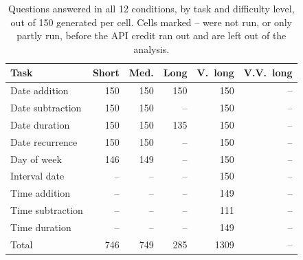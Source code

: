 \begin{table}[t]
\centering
\small
\setlength{\tabcolsep}{3.5pt}
\begin{tabular}{@{}lrrrrr@{}}
\toprule
Task & Short & Med. & Long & V.\ long & V.V.\ long \\
\midrule
Date addition & 150 & 150 & 150 & 150 & -- \\
Date subtraction & 150 & 150 & -- & 150 & -- \\
Date duration & 150 & 150 & 135 & 150 & -- \\
Date recurrence & 150 & 150 & -- & 150 & -- \\
Day of week & 146 & 149 & -- & 150 & -- \\
Interval date & -- & -- & -- & 150 & -- \\
Time addition & -- & -- & -- & 149 & -- \\
Time subtraction & -- & -- & -- & 111 & -- \\
Time duration & -- & -- & -- & 149 & -- \\
\midrule
Total & 746 & 749 & 285 & 1309 & -- \\
\bottomrule
\end{tabular}
\caption{Questions answered in all 12 conditions, by task and difficulty level, out of 150 generated per cell. Cells marked -- were not run, or only partly run, before the API credit ran out and are left out of the analysis.}
\label{tab:coverage}
\end{table}
